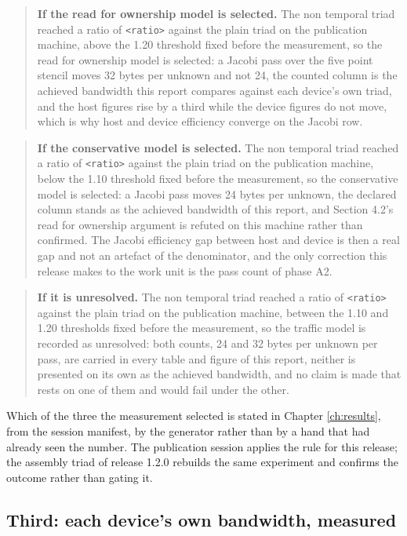 \begin{quote}
\textbf{If the read for ownership model is selected.} The non temporal triad
reached a ratio of \texttt{<ratio>} against the plain triad on the publication
machine, above the 1.20 threshold fixed before the measurement, so the read for
ownership model is selected: a Jacobi pass over the five point stencil moves 32
bytes per unknown and not 24, the counted column is the achieved bandwidth this
report compares against each device's own triad, and the host figures rise by a
third while the device figures do not move, which is why host and device
efficiency converge on the Jacobi row.
\end{quote}

\begin{quote}
\textbf{If the conservative model is selected.} The non temporal triad reached a
ratio of \texttt{<ratio>} against the plain triad on the publication machine,
below the 1.10 threshold fixed before the measurement, so the conservative model
is selected: a Jacobi pass moves 24 bytes per unknown, the declared column
stands as the achieved bandwidth of this report, and Section 4.2's read for
ownership argument is refuted on this machine rather than confirmed. The Jacobi
efficiency gap between host and device is then a real gap and not an artefact of
the denominator, and the only correction this release makes to the work unit is
the pass count of phase A2.
\end{quote}

\begin{quote}
\textbf{If it is unresolved.} The non temporal triad reached a ratio of
\texttt{<ratio>} against the plain triad on the publication machine, between the
1.10 and 1.20 thresholds fixed before the measurement, so the traffic model is
recorded as unresolved: both counts, 24 and 32 bytes per unknown per pass, are
carried in every table and figure of this report, neither is presented on its
own as the achieved bandwidth, and no claim is made that rests on one of them
and would fail under the other.
\end{quote}

Which of the three the measurement selected is stated in Chapter
\ref{ch:results}, from the session manifest, by the generator rather than by a
hand that had already seen the number. The publication session applies the rule
for this release; the assembly triad of release 1.2.0 rebuilds the same
experiment and confirms the outcome rather than gating it.

\subsection{Third: each device's own bandwidth, measured}

